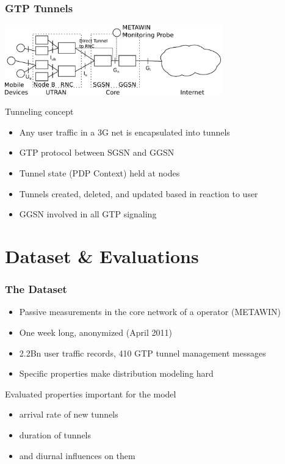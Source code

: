 \documentclass{beamer}
\begin{document}
\begin{frame}
    \frametitle{GTP Tunnels}

      \begin{center}
		\includegraphics[height=3cm]{figures/umts-network.pdf}
	\end{center}


	Tunneling concept
    \begin{itemize}
		\item Any user traffic in a 3G net is encapsulated into tunnels
		\item GTP protocol between SGSN and GGSN
		\item Tunnel state (PDP Context) held at nodes
		\item Tunnels created, deleted, and updated based in reaction to user
		\item GGSN involved in all GTP signaling
	\end{itemize}
\end{frame}


\section{Dataset \& Evaluations}

\begin{frame}
	\frametitle{The Dataset}

	\begin{itemize}
		\item Passive measurements in the core network of a operator (METAWIN)
		\item One week long, anonymized (April 2011)
		\item 2.2Bn user traffic records, 410 GTP tunnel management messages
		\item Specific properties make distribution modeling hard 
	\end{itemize}

	Evaluated properties important for the model
	\begin{itemize}
		\item arrival rate of new tunnels
		\item duration of tunnels
		\item and diurnal influences on them
	\end{itemize}

\end{frame}
\end{document}

